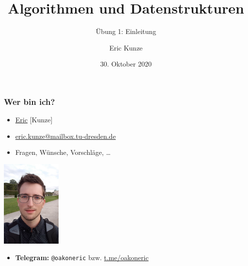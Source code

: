 \documentclass{beamer}
\begin{document}
	
	\title{Algorithmen und Datenstrukturen}
	\subtitle{Übung 1: Einleitung}
	\author{Eric Kunze}
	\date{30. Oktober 2020}

	\maketitle
	
	\begin{frame} \frametitle{Wer bin ich?}
		\begin{minipage}{\dimexpr0.75\linewidth-\fboxrule-\fboxsep}
			\begin{itemize}
				\item \uline{Eric} [Kunze]
				\item \url{eric.kunze@mailbox.tu-dresden.de}
				\item Fragen, Wünsche, Vorschläge, \dots 
			\end{itemize}
		\end{minipage}
		\begin{minipage}{\dimexpr0.25\linewidth-\fboxrule-\fboxsep}
			\includegraphics[width=3cm]{./tut01_pic.jpg}
		\end{minipage}		
		
		\begin{itemize}
			\item \textbf{Telegram:} \texttt{@oakoneric} bzw. \url{t.me/oakoneric}
		\end{itemize}
	\end{frame}
\end{document}
